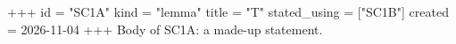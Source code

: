 +++
id = "SC1A"
kind = "lemma"
title = "T"
stated_using = ["SC1B"]
created = 2026-11-04
+++
Body of SC1A: a made-up statement.
